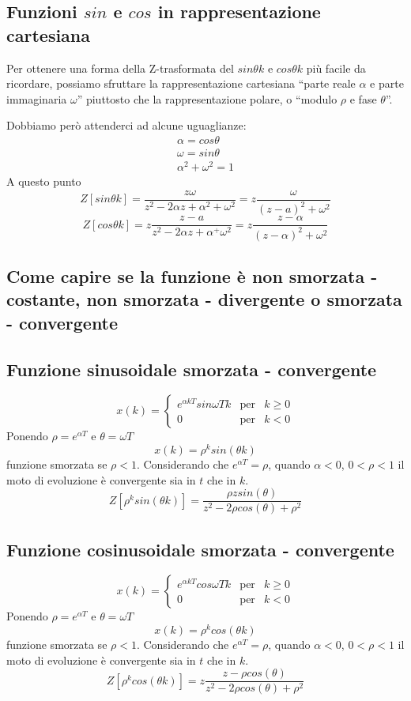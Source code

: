\documentclass[a4paper]{report}
\begin{document}
\subsection{Funzioni $sin$ e $cos$ in rappresentazione cartesiana}
Per ottenere una forma della Z-trasformata del $sin \theta k$ e $cos
\theta k$ pi\`u facile da ricordare, possiamo sfruttare la
rappresentazione cartesiana ``parte reale $\alpha$ e parte immaginaria
$\omega$'' piuttosto che la rappresentazione polare, o ``modulo $\rho$
e fase $\theta$''.

Dobbiamo per\`o attenderci ad alcune uguaglianze:
\[
\begin{array}{l}
  \alpha = cos \theta\\
  \omega = sin \theta\\
  \alpha^2 + \omega^2 = 1
\end{array}
\]
A questo punto
\[
Z[sin \theta k ] = \dfrac{z \omega}{z^2 - 2 \alpha z + \alpha^2 +
  \omega^2} = z \dfrac{\omega}{(z - a)^2 + \omega^2}
\]
\[
Z[cos \theta k] = z \dfrac{z - a}{z^2 - 2 \alpha z + \alpha^ +
  \omega^2} = z \dfrac{z - \alpha}{(z - \alpha)^2 + \omega^2}
\]

\subsection{Come capire se la funzione \`e non smorzata - costante,
  non smorzata - divergente o smorzata - convergente}

\subsection{Funzione sinusoidale smorzata - convergente}
\[
x(k) =
\left\{
\begin{array}{lll}
  e^{\alpha k T}sin \omega Tk & \textrm{per} & k \geq 0\\
  0 & \textrm{per} & k < 0
\end{array}
\right.
\]
Ponendo $\rho = e^{\alpha T}$ e $\theta = \omega T$
\[
x(k) = \rho^{k} sin (\theta k)
\]
funzione smorzata se $\rho < 1$. Considerando che $e^{\alpha T} =
\rho$, quando $\alpha < 0$, $0 < \rho < 1$ il moto di evoluzione \`e
convergente sia in $t$ che in $k$.
\[
Z[\rho^k sin(\theta k)] = \dfrac{\rho z sin(\theta)}{z^2 - 2 \rho
  cos(\theta) + \rho^2}
\]

\subsection{Funzione cosinusoidale smorzata - convergente}
\[
x(k) =
\left\{
\begin{array}{lll}
  e^{\alpha k T} cos \omega Tk & \textrm{per} & k \geq 0\\
  0 & \textrm{per} & k < 0
\end{array}
\right.
\]
Ponendo $\rho = e^{\alpha T}$ e $\theta = \omega T$
\[
x(k) = \rho^{k} cos (\theta k)
\]
funzione smorzata se $\rho < 1$. Considerando che $e^{\alpha T} =
\rho$, quando $\alpha < 0$, $0 < \rho < 1$ il moto di evoluzione \`e
convergente sia in $t$ che in $k$.
\[
Z[\rho^k cos(\theta k)] = z\dfrac{z - \rho cos(\theta)}{z^2 - 2 \rho
  cos(\theta) + \rho^2}
\]
\end{document}
